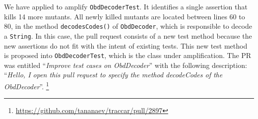 We have applied \dspot to amplify \texttt{ObdDecoderTest}. It identifies a single assertion that kills 14 more mutants.
All newly killed mutants are located between lines 60 to 80, \ie in the method \texttt{decodesCodes()} of \texttt{ObdDecoder}, which is responsible to decode a \texttt{String}. In this case, the pull request consists of a new test method because the new assertions do not fit with the intent of existing tests. 
This new test method is proposed into \texttt{ObdDecoderTest}, which is the class under amplification. The PR was entitled ``\emph{Improve test cases on ObdDecoder}'' with the following description: ``\emph{Hello, I open this pull request to specify the method decodeCodes of the ObdDecoder}''. \footnote{\url{https://github.com/tananaev/traccar/pull/2897}}
\begin{figure}[H]
	\centering{}
\end{figure}

